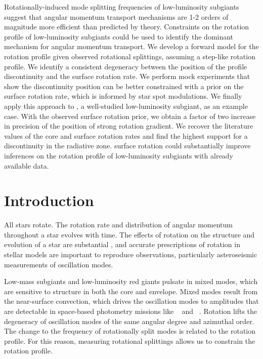 Rotationally-induced mode splitting frequencies of low-luminosity subgiants suggest that angular momentum transport mechanisms are 1-2 orders of magnitude more efficient  than predicted by theory. Constraints on the rotation profile of low-luminosity subgiants could be used to identify the dominant mechanism for angular momentum transport. We develop a forward model for the rotation profile given observed rotational splittings, assuming a step-like rotation profile. We identify a consistent degeneracy between the position of the profile discontinuity and the surface rotation rate. We perform mock experiments that show the discontinuity position can be better constrained with a prior on the surface rotation rate, which is informed by star spot modulations. We finally apply this approach to \thestar, a well-studied low-luminosity subgiant, as an example case. With the observed surface rotation prior, we obtain a factor of two increase in precision of the position of strong rotation gradient. We recover the literature values of the core and surface rotation rates and find the highest support for a discontinuity in the radiative zone. surface rotation could substantially improve inferences on the rotation profile of low-luminosity subgiants with already available data.

\newpage

\section{Introduction}
\label{sec:intro}

All stars rotate. The rotation rate and distribution of angular momentum throughout a star evolves with time. The effects of rotation on the structure and evolution of a star are substantial \citep[e.g.][]{heger_presupernova_1998,maeder_evolution_2000}, and accurate prescriptions of rotation in stellar models are important to reproduce observations, particularly asteroseismic measurements of oscillation modes.

Low-mass subgiants and low-luminosity red giants pulsate in mixed modes, which are sensitive to structure in both the core and envelope. Mixed modes result from the near-surface convection, which drives the oscillation modes to amplitudes that are detectable in space-based photometry missions like \corot\ \citep{baglin_corot_2003} and \kepler\ \citep{borucki_kepler_2010}. Rotation lifts the degeneracy of oscillation modes of the same angular degree and azimuthal order. The change to the frequency of rotationally split modes is related to the rotation profile. For this reason, measuring rotational splittings allows us to constrain the rotation profile.


